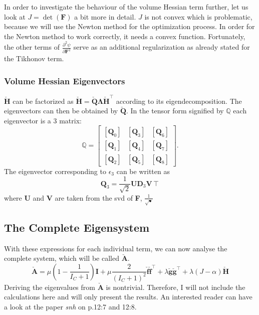 In order to investigate the behaviour of the volume Hessian term further, let us look at $J = \operatorname{det}(\mathbf{F})$ a bit more in detail. $J$ is not convex which is problematic, because we will use the Newton method for the optimization process. In order for the Newton method to work correctly, it needs a convex function. Fortunately, the other terms of $\frac{\partial^2 \psi}{\partial \mathbf{F}^2}$ serve as an additional regularization as already stated for the Tikhonov term.


\subsubsection{Volume Hessian Eigenvectors}
$\mathbf{\check{H}}$ can be factorized as $\mathbf{\check{H}} = \mathbf{\check{Q}}\mathbf{\Lambda}\mathbf{\check{H}}^\intercal$ according to its eigendecomposition. The eigenvectors can then be obtained by $\mathbf{\check{Q}}$. In the tensor form signified by $\mathbb{Q}$ each eigenvector is a 3  matrix:
\[
\mathbb{Q} = \left[\begin{array}{ccc}{\left[\mathbf{Q}_0\right]} & {\left[\mathbf{Q}_3\right]} & {\left[\mathbf{Q}_6\right]} \\ {\left[\mathbf{Q}_1\right]} & {\left[\mathbf{Q}_4\right]} & {\left[\mathbf{Q}_7\right]} \\ {\left[\mathbf{Q}_2\right]} & {\left[\mathbf{Q}_5\right]} & {\left[\mathbf{Q}_8\right]} \end{array}\right].
\]
The eigenvector corresponding to $\epsilon_3$ can be written as
\[
\mathbf{Q}_3 = \frac{1}{\sqrt{2}} \mathbf{U} \mathbf{D}_3 \mathbf{V}\intercal
\]
where \textbf{U} and \textbf{V} are taken from the \acrshort{svd} of \textbf{F}, $\frac{1}{\sqrt{•}}$


\subsection{The Complete Eigensystem}
With these expressions for each individual term, we can now analyse the complete system, which will be called $\mathbf{\check{A}}$.
\[
	\mathbf{\check{A}} = \mu \left(1-\frac{1}{I_C+1} \right) \mathbf{I} + \mu \frac{2}{(I_C +1)^2} \mathbf{\check{f}\check{f}}^\intercal + \lambda \mathbf{\check{g}\check{g}}^\intercal + \lambda (J-\alpha) \mathbf{\check{H}}
\]
Deriving the eigenvalues from $\mathbf{\check{A}}$ is nontrivial. Therefore, I will not include the calculations here and will only present the results. An interested reader can have a look at the paper \textit{\acrshort{snh}} on p.12:7 and 12:8.

